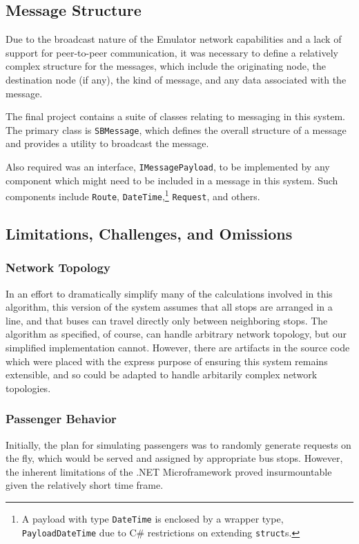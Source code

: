\documentclass[runningheads]{llncs}
\begin{document}
\subsection{Message Structure}
Due to the broadcast nature of the Emulator network capabilities and a lack of support for peer-to-peer communication, it was necessary to define a relatively complex structure for the messages, which include the originating node, the destination node (if any), the kind of message, and any data associated with the message.

The final project contains a suite of classes relating to messaging in this system. The primary class is \lstinline{SBMessage}, which defines the overall structure of a message and provides a utility to broadcast the message.

Also required was an interface, \lstinline{IMessagePayload}, to be implemented by any component which might need to be included in a message in this system. Such components include \lstinline{Route}, \lstinline{DateTime},\footnote{A payload with type \lstinline|DateTime| is enclosed by a wrapper type, \lstinline|PayloadDateTime| due to C\# restrictions on extending \lstinline|struct|s.} \lstinline{Request}, and others.


\subsection{Limitations, Challenges, and Omissions}
\subsubsection{Network Topology}
In an effort to dramatically simplify many of the calculations involved in this algorithm, this version of the system assumes that all stops are arranged in a line, and that buses can travel directly only between neighboring stops. The algorithm as specified, of course, can handle arbitrary network topology, but our simplified implementation cannot. However, there are artifacts in the source code which were placed with the express purpose of ensuring this system remains extensible, and so could be adapted to handle arbitarily complex network topologies.

\subsubsection{Passenger Behavior}
\label{sub:passengers}
Initially, the plan for simulating passengers was to randomly generate requests on the fly, which would be served and assigned by appropriate bus stops. However, the inherent limitations of the .NET Microframework proved insurmountable given the relatively short time frame.
\end{document}

